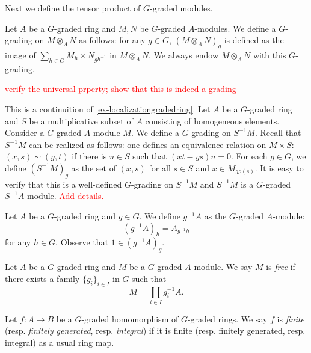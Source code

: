 Next we define the tensor product of $G$-graded modules.
\begin{definition}
    Let $A$ be a $G$-graded ring and $M,N$ be $G$-graded $A$-modules. We define a $G$-grading on $M\otimes_A N$ as follows: for any $g\in G$, $(M\otimes_A N)_g$ is defined as the image of $\sum_{h\in G}M_h\times N_{gh^{-1}}$ in $M\otimes_A N$. We always endow $M\otimes_A N$ with this $G$-grading.
\end{definition}
\textcolor{red}{verify the universal prperty; show that this is indeed a grading}

\begin{example}\label{ex-localizationgradedmodule}
    This is a continuition of \cref{ex-localizationgradedring}.
    Let $A$ be a $G$-graded ring and $S$ be a multiplicative subset of $A$ consisting of homogeneous elements. Consider a $G$-graded $A$-module $M$. We define a $G$-grading on $S^{-1}M$. Recall that $S^{-1}M$ can be realized as follows: one defines an equivalence relation on $M\times S$: $(x,s)\sim (y,t)$ if there is $u\in S$ such that $(xt-ys)u=0$. For each $g\in G$, we define $(S^{-1}M)_g$ as the set of $(x,s)$ for all $s\in S$ and $x\in M_{g\rho(s)}$. It is easy to verify that this is a well-defined $G$-grading on $S^{-1}M$ and $S^{-1}M$ is a $G$-graded $S^{-1}A$-module.  \textcolor{red}{Add details.}
\end{example}

\begin{example}\label{ex-twistmodule}
    Let $A$ be a $G$-graded ring and $g\in G$. We define $g^{-1}A$ as the $G$-graded $A$-module:
    \[
        (g^{-1}A)_h=A_{g^{-1}h}
    \]
    for any $h\in G$. Observe that $1\in (g^{-1}A)_g$.
\end{example}

\begin{definition}
    Let $A$ be a $G$-graded ring and $M$ be a $G$-graded $A$-module. We say $M$ is \emph{free} if there exists a family $\{g_i\}_{i\in I}$ in $G$ such that
    \[
        M=\coprod_{i\in I} g_i^{-1}A.  
    \]
\end{definition}

\begin{definition}
    Let $f:A\rightarrow B$ be a $G$-graded homomorphism of $G$-graded rings. We say $f$ is \emph{finite} (resp. \emph{finitely generated}, resp. \emph{integral}) if it is finite (resp. finitely generated, resp. integral) as a usual ring map.
\end{definition}

